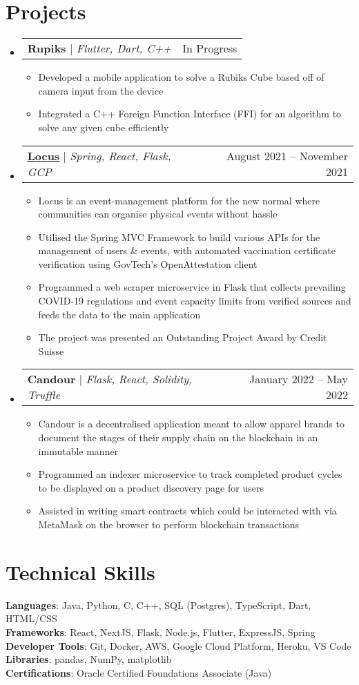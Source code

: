 \documentclass[letterpaper,11pt]{article}
\makeatletter
\newcommand{\resumeItem}[1]{
  \item\small{
    {#1 \vspace{-2pt}}
  }
}
\newcommand{\resumeProjectHeading}[2]{
    \item
    \begin{tabular*}{0.97\textwidth}{l@{\extracolsep{\fill}}r}
      \small#1 & #2 \\
    \end{tabular*}\vspace{-7pt}
}
\newcommand{\resumeSubHeadingListStart}{\begin{itemize}[leftmargin=0.15in, label={}]}
\newcommand{\resumeSubHeadingListEnd}{\end{itemize}}
\newcommand{\resumeItemListStart}{\begin{itemize}}
\newcommand{\resumeItemListEnd}{\end{itemize}\vspace{-5pt}}
\makeatother
\begin{document}
\section{Projects}
    \resumeSubHeadingListStart
      \resumeProjectHeading
          {\textbf{Rupiks} $|$ \emph{Flutter, Dart, C++}}{In Progress}
          \resumeItemListStart
            \resumeItem{Developed a mobile application to solve a Rubiks Cube based off of camera input from the device}
            \resumeItem{Integrated a C++ Foreign Function Interface (FFI) for an algorithm to solve any given cube efficiently}
          \resumeItemListEnd
      \resumeProjectHeading
          {\textbf{\href{https://github.com/omerwyo/Locus}{\underline{Locus}}} $|$ \emph{Spring, React, Flask, GCP}}{August 2021 -- November 2021}
          \resumeItemListStart
            \resumeItem{Locus is an event-management platform for the new normal where communities can organise physical events without hassle}
            \resumeItem{Utilised the Spring MVC Framework to build various APIs for the management of users \& events, with automated vaccination certificate verification using GovTech's OpenAttestation client}
            \resumeItem{Programmed a web scraper microservice in Flask that collects prevailing COVID-19 regulations and event capacity limits from verified sources and feeds the data to the main application}
            \resumeItem{The project was presented an Outstanding Project Award by Credit Suisse}
          \resumeItemListEnd
      \resumeProjectHeading
          {\textbf{Candour} $|$ \emph{Flask, React, Solidity, Truffle}}{January 2022 -- May 2022}
          \resumeItemListStart
            \resumeItem{Candour is a decentralised application meant to allow apparel brands to document the stages of their supply chain on the blockchain in an immutable manner}
            \resumeItem{Programmed an indexer microservice to track completed product cycles to be displayed on a product discovery page for users}
            \resumeItem{Assisted in writing smart contracts which could be interacted with via MetaMask on the browser to perform blockchain transactions}
          \resumeItemListEnd
    \resumeSubHeadingListEnd

%
\section{Technical Skills}
 \begin{itemize}[leftmargin=0.15in, label={}]
    \small{\item{
     \textbf{Languages}{: Java, Python, C, C++, SQL (Postgres), TypeScript, Dart, HTML/CSS} \\
     \textbf{Frameworks}{: React, NextJS, Flask, Node.js, Flutter, ExpressJS, Spring} \\
     \textbf{Developer Tools}{: Git, Docker, AWS, Google Cloud Platform, Heroku, VS Code } \\
     \textbf{Libraries}{: pandas, NumPy, matplotlib} \\
     \textbf{Certifications}{: Oracle Certified Foundations Associate (Java)}
    }}
 \end{itemize}


\end{document}
